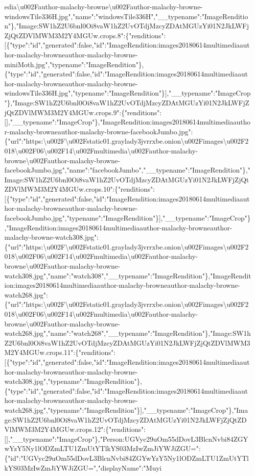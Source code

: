 edia\textbackslash{}u002Fauthor-malachy-browne\textbackslash{}u002Fauthor-malachy-browne-windowsTile336H.jpg","name":"windowsTile336H","\_\_typename":"ImageRendition"\},"Image:SW1hZ2U6bnl0Oi8vaW1hZ2UvOTdjMzcyZDAtMGUzYi01N2JkLWFjZjQtZDVlMWM3M2Y4MGUw.crops.8":\{"renditions":{[}\{"type":"id","generated":false,"id":"ImageRendition:images20180614multimediaauthor-malachy-browneauthor-malachy-browne-miniMoth.jpg","typename":"ImageRendition"\},\{"type":"id","generated":false,"id":"ImageRendition:images20180614multimediaauthor-malachy-browneauthor-malachy-browne-windowsTile336H.jpg","typename":"ImageRendition"\}{]},"\_\_typename":"ImageCrop"\},"Image:SW1hZ2U6bnl0Oi8vaW1hZ2UvOTdjMzcyZDAtMGUzYi01N2JkLWFjZjQtZDVlMWM3M2Y4MGUw.crops.9":\{"renditions":{[}{]},"\_\_typename":"ImageCrop"\},"ImageRendition:images20180614multimediaauthor-malachy-browneauthor-malachy-browne-facebookJumbo.jpg":\{"url":"https:\textbackslash{}u002F\textbackslash{}u002Fstatic01.graylady3jvrrxbe.onion\textbackslash{}u002Fimages\textbackslash{}u002F2018\textbackslash{}u002F06\textbackslash{}u002F14\textbackslash{}u002Fmultimedia\textbackslash{}u002Fauthor-malachy-browne\textbackslash{}u002Fauthor-malachy-browne-facebookJumbo.jpg","name":"facebookJumbo","\_\_typename":"ImageRendition"\},"Image:SW1hZ2U6bnl0Oi8vaW1hZ2UvOTdjMzcyZDAtMGUzYi01N2JkLWFjZjQtZDVlMWM3M2Y4MGUw.crops.10":\{"renditions":{[}\{"type":"id","generated":false,"id":"ImageRendition:images20180614multimediaauthor-malachy-browneauthor-malachy-browne-facebookJumbo.jpg","typename":"ImageRendition"\}{]},"\_\_typename":"ImageCrop"\},"ImageRendition:images20180614multimediaauthor-malachy-browneauthor-malachy-browne-watch308.jpg":\{"url":"https:\textbackslash{}u002F\textbackslash{}u002Fstatic01.graylady3jvrrxbe.onion\textbackslash{}u002Fimages\textbackslash{}u002F2018\textbackslash{}u002F06\textbackslash{}u002F14\textbackslash{}u002Fmultimedia\textbackslash{}u002Fauthor-malachy-browne\textbackslash{}u002Fauthor-malachy-browne-watch308.jpg","name":"watch308","\_\_typename":"ImageRendition"\},"ImageRendition:images20180614multimediaauthor-malachy-browneauthor-malachy-browne-watch268.jpg":\{"url":"https:\textbackslash{}u002F\textbackslash{}u002Fstatic01.graylady3jvrrxbe.onion\textbackslash{}u002Fimages\textbackslash{}u002F2018\textbackslash{}u002F06\textbackslash{}u002F14\textbackslash{}u002Fmultimedia\textbackslash{}u002Fauthor-malachy-browne\textbackslash{}u002Fauthor-malachy-browne-watch268.jpg","name":"watch268","\_\_typename":"ImageRendition"\},"Image:SW1hZ2U6bnl0Oi8vaW1hZ2UvOTdjMzcyZDAtMGUzYi01N2JkLWFjZjQtZDVlMWM3M2Y4MGUw.crops.11":\{"renditions":{[}\{"type":"id","generated":false,"id":"ImageRendition:images20180614multimediaauthor-malachy-browneauthor-malachy-browne-watch308.jpg","typename":"ImageRendition"\},\{"type":"id","generated":false,"id":"ImageRendition:images20180614multimediaauthor-malachy-browneauthor-malachy-browne-watch268.jpg","typename":"ImageRendition"\}{]},"\_\_typename":"ImageCrop"\},"Image:SW1hZ2U6bnl0Oi8vaW1hZ2UvOTdjMzcyZDAtMGUzYi01N2JkLWFjZjQtZDVlMWM3M2Y4MGUw.crops.12":\{"renditions":{[}{]},"\_\_typename":"ImageCrop"\},"Person:UGVyc29uOm55dDovL3BlcnNvbi84ZGYwYzY5Ny1lODZmLTU1ZmUtYTlkYS03MzIwZmJiYWJiZGU=":\{"id":"UGVyc29uOm55dDovL3BlcnNvbi84ZGYwYzY5Ny1lODZmLTU1ZmUtYTlkYS03MzIwZmJiYWJiZGU=","displayName":"Muyi
